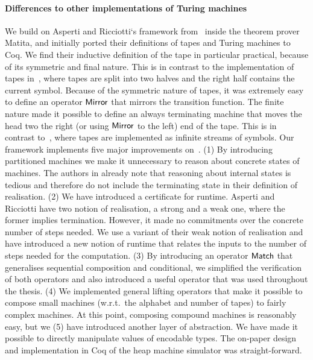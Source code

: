 \paragraph{Differences to other implementations of Turing machines}
We build on Asperti and Ricciotti`s framework from~\cite{asperti2015} inside the theorem prover Matita, and initially ported their definitions of
tapes and Turing machines to Coq.  We find their inductive definition of the tape in particular practical, because of its symmetric and final nature.
This is in contrast to the implementation of tapes in~\cite{Xu:2013:MTM:2529315.2529331}, where tapes are split into two halves and the right half
contains the current symbol.  Because of the symmetric nature of tapes, it was extremely easy to define an operator $\mathsf{Mirror}$ that mirrors the
transition function.  The finite nature made it possible to define an always terminating machine that moves the head two the right (or using
$\mathsf{Mirror}$ to the left) end of the tape.  This is in contrast to~\cite{Ciaffaglione:2016:TTC:2956213.2956306}, where tapes are implemented as
infinite streams of symbols.  Our framework implements five major improvements on~\cite{asperti2015}.  (1) By introducing partitioned machines we make
it unnecessary to reason about concrete states of machines.  The authors in \cite{asperti2015} already note that reasoning about internal states is
tedious and therefore do not include the terminating state in their definition of realisation.  (2) We have introduced a certificate for runtime.
Asperti and Ricciotti have two notion of realisation, a strong and a weak one, where the former implies termination.  However, it made no commitments
over the concrete number of steps needed.  We use a variant of their weak notion of realisation and have introduced a new notion of runtime that
relates the inputs to the number of steps needed for the computation.  (3) By introducing an operator $\mathsf{Match}$ that generalises sequential
composition and conditional, we simplified the verification of both operators and also introduced a useful operator that was used throughout the
thesis.  (4) We implemented general lifting operators that make it possible to compose small machines (w.r.t.\ the alphabet and number of tapes) to
fairly complex machines.  At this point, composing compound machines is reasonably easy, but we (5) have introduced another layer of abstraction.  We
have made it possible to directly manipulate values of encodable types.  The on-paper design and implementation in Coq of the heap machine simulator
 was straight-forward.


